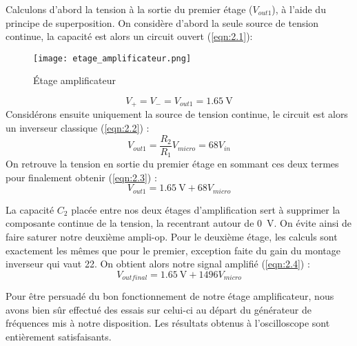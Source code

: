 Calculons d'abord la tension à la sortie du premier étage ($V_{out 1}$), à l'aide du principe de superposition. On considère d'abord la seule source de tension continue, la capacité est alors un circuit ouvert (\ref{eqn:2.1}):
\begin{figure}
\centering
\texttt{[image: etage\_amplificateur.png]}
\caption{Étage amplificateur}
\label{fig:etage amplificateur}
\end{figure}
\begin{equation}
V_{+} = V_{-} = V_{out 1} = \SI{1.65}{\volt}
\label{eqn:2.1}
\end{equation}
Considérons ensuite uniquement la source de tension continue, le circuit est alors un inverseur classique (\ref{eqn:2.2}) : 
\begin{equation}
V_{out 1} = \frac{R_2}{R_1} V_{micro} = 68 V_{in}
\label{eqn:2.2}
\end{equation}
On retrouve la tension en sortie du premier étage en sommant ces deux termes pour finalement obtenir (\ref{eqn:2.3}) :
\begin{equation}
V_{out 1} = \SI{1.65}{\volt} + 68 V_{micro}
\label{eqn:2.3}
\end{equation}

La capacité $C_{2}$ placée entre nos deux étages d'amplification sert à supprimer la composante continue de la tension, la recentrant autour de \SI{0}{\volt}. On évite ainsi de faire saturer notre deuxième ampli-op. Pour le deuxième étage, les calculs sont exactement les mêmes que pour le premier, exception faite du gain du montage inverseur qui vaut 22. On obtient alors notre signal amplifié (\ref{eqn:2.4}) : 
\begin{equation}
V_{out final} = \SI{1.65}{\volt} + 1496 V_{micro}
\label{eqn:2.4}
\end{equation}

Pour être persuadé du bon fonctionnement de notre étage amplificateur, nous avons bien sûr effectué des essais sur celui-ci au départ du générateur de fréquences mis à notre disposition. Les résultats obtenus à l'oscilloscope sont entièrement satisfaisants. 


